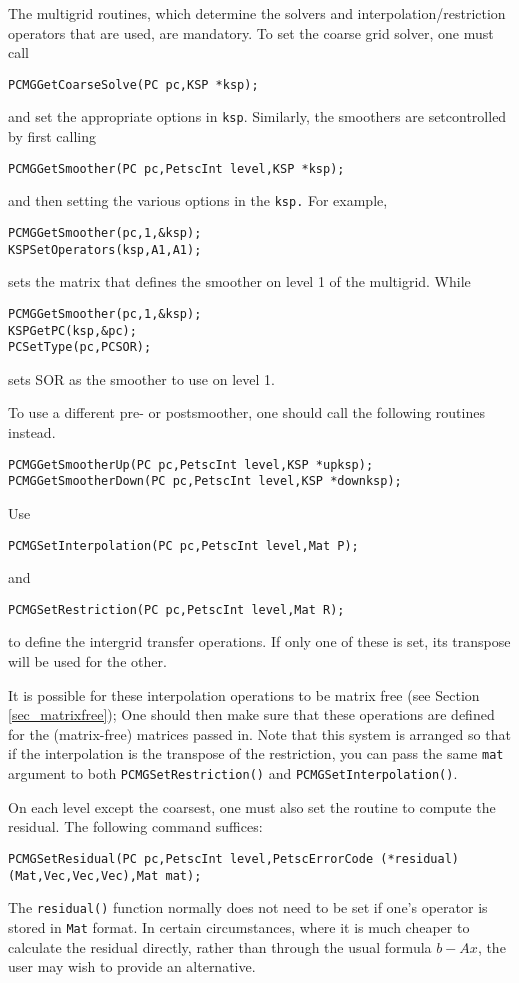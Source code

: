 The multigrid routines, which determine
the solvers and interpolation/restriction operators that are used,
are mandatory.
To set the coarse grid solver, one must 
call
\begin{lstlisting}
PCMGGetCoarseSolve(PC pc,KSP *ksp);
\end{lstlisting}
and set the appropriate options in \lstinline{ksp}. Similarly, the
smoothers are setcontrolled by first calling
\begin{lstlisting}
PCMGGetSmoother(PC pc,PetscInt level,KSP *ksp);
\end{lstlisting}
and then setting the various options in the \lstinline{ksp.} For example,
\begin{lstlisting}
PCMGGetSmoother(pc,1,&ksp);
KSPSetOperators(ksp,A1,A1);
\end{lstlisting}
sets the matrix that defines the smoother on level 1 of the multigrid. While
\begin{lstlisting}
PCMGGetSmoother(pc,1,&ksp);
KSPGetPC(ksp,&pc);
PCSetType(pc,PCSOR);
\end{lstlisting}
sets SOR as the smoother to use on level 1.

To use a different pre- or postsmoother, one should call the following
routines instead.
\begin{lstlisting}
PCMGGetSmootherUp(PC pc,PetscInt level,KSP *upksp);
PCMGGetSmootherDown(PC pc,PetscInt level,KSP *downksp);
\end{lstlisting}

Use
\begin{lstlisting}
PCMGSetInterpolation(PC pc,PetscInt level,Mat P);
\end{lstlisting}
and
\begin{lstlisting}
PCMGSetRestriction(PC pc,PetscInt level,Mat R);
\end{lstlisting}
to define the intergrid transfer operations.  If only one of these is
set, its transpose will be used for the other.

It is possible for these interpolation operations to be matrix free
(see Section \ref{sec_matrixfree});
One should then make sure that these operations are defined for the (matrix-free) matrices
passed in.
Note that this system is arranged so that if the interpolation is
the transpose of the restriction, you can pass the same \lstinline{mat}
argument to both \lstinline{PCMGSetRestriction()} and \lstinline{PCMGSetInterpolation()}.

On each level except the coarsest, one must also set the routine to
compute the residual.  The following command suffices:
\begin{lstlisting}
PCMGSetResidual(PC pc,PetscInt level,PetscErrorCode (*residual)(Mat,Vec,Vec,Vec),Mat mat);
\end{lstlisting}
The \lstinline{residual()} function normally does not need to be set if
one's operator is stored in \lstinline{Mat} format.  In certain circumstances,
where it is much cheaper to calculate the residual directly, rather
than through the usual formula $b - Ax$,  the user may wish to provide
an alternative.

